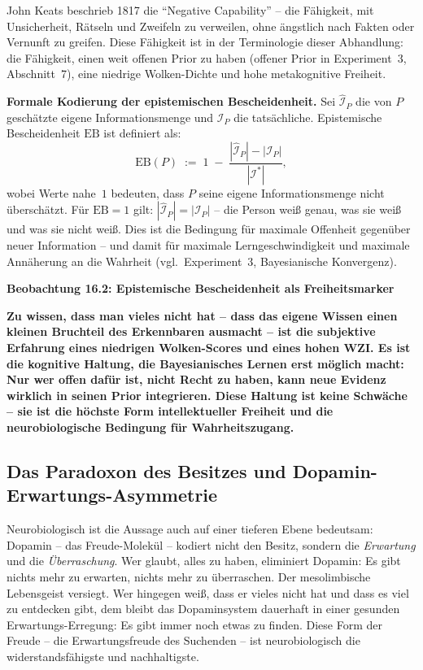 ﻿\documentclass[12pt,a4paper]{report}
\theoremstyle{plain}
\theoremstyle{definition}
\theoremstyle{remark}
\begin{document}
	John Keats beschrieb 1817 die ``Negative Capability'' --
	die Fähigkeit, mit Unsicherheit, Rätseln und Zweifeln
	zu verweilen, ohne ängstlich nach Fakten oder Vernunft zu greifen.
	Diese Fähigkeit ist in der Terminologie dieser Abhandlung:
	die Fähigkeit, einen weit offenen Prior zu haben
	(offener Prior in Experiment~3, Abschnitt~7),
	eine niedrige Wolken-Dichte und hohe metakognitive Freiheit.

	\textbf{Formale Kodierung der epistemischen Bescheidenheit.}
	Sei $\hat{\mathcal{I}}_P$ die von $P$ geschätzte eigene
	Informationsmenge und $\mathcal{I}_P$ die tatsächliche.
	Epistemische Bescheidenheit $\mathrm{EB}$ ist definiert als:
	\[
	\mathrm{EB}(P)
	\;:=\; 1 \;-\;
	\frac{|\hat{\mathcal{I}}_P| - |\mathcal{I}_P|}{|\mathcal{I}^*|},
	\]
	wobei Werte nahe~$1$ bedeuten, dass $P$ seine eigene
	Informationsmenge nicht überschätzt.
	Für $\mathrm{EB} = 1$ gilt: $|\hat{\mathcal{I}}_P| = |\mathcal{I}_P|$ --
	die Person weiß genau, was sie weiß und was sie nicht weiß.
	Dies ist die Bedingung für maximale Offenheit gegenüber neuer
	Information -- und damit für maximale Lerngeschwindigkeit und
	maximale Annäherung an die Wahrheit (vgl.\ Experiment~3,
	Bayesianische Konvergenz).

	
	\noindent\textbf{Beobachtung 16.2: Epistemische Bescheidenheit als Freiheitsmarker}

		\textbf{Zu wissen, dass man vieles nicht hat -- dass das eigene
		Wissen einen kleinen Bruchteil des Erkennbaren ausmacht --
		ist die subjektive Erfahrung eines niedrigen Wolken-Scores
		und eines hohen WZI. Es ist die kognitive Haltung, die
		Bayesianisches Lernen erst möglich macht:
		Nur wer offen dafür ist, nicht Recht zu haben,
		kann neue Evidenz wirklich in seinen Prior integrieren.
		Diese Haltung ist keine Schwäche -- sie ist die höchste Form
		intellektueller Freiheit und die neurobiologische Bedingung
		für Wahrheitszugang.}


	\subsection{Das Paradoxon des Besitzes und Dopamin-Erwartungs-Asymmetrie}

	Neurobiologisch ist die Aussage auch auf einer tieferen Ebene bedeutsam:
	Dopamin -- das Freude-Molekül -- kodiert nicht den Besitz,
	sondern die \emph{Erwartung} und die \emph{Überraschung}.
	Wer glaubt, alles zu haben, eliminiert Dopamin:
	Es gibt nichts mehr zu erwarten, nichts mehr zu überraschen.
	Der mesolimbische Lebensgeist versiegt.
	Wer hingegen weiß, dass er vieles nicht hat und dass es viel zu entdecken
	gibt, dem bleibt das Dopaminsystem dauerhaft in einer gesunden
	Erwartungs-Erregung: Es gibt immer noch etwas zu finden.
	Diese Form der Freude -- die Erwartungsfreude des Suchenden --
	ist neurobiologisch die widerstandsfähigste und nachhaltigste.
\end{document}
